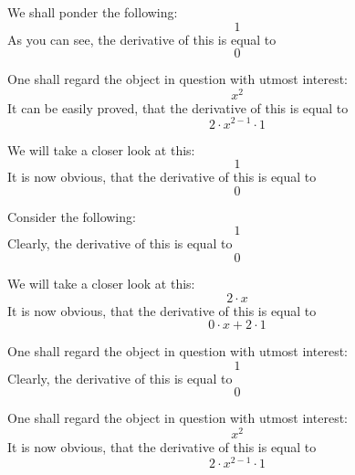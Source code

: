\documentclass{article}
\begin{document}
We shall ponder the following:
\begin{equation}
1 
\end{equation}
As you can see, the derivative of this is equal to
\begin{equation}
0 
\end{equation}

One shall regard the object in question with utmost interest:
\begin{equation}
x ^{2 } 
\end{equation}
It can be easily proved, that the derivative of this is equal to
\begin{equation}
2 \cdot x ^{2 - 1 } \cdot 1 
\end{equation}

We will take a closer look at this:
\begin{equation}
1 
\end{equation}
It is now obvious, that the derivative of this is equal to
\begin{equation}
0 
\end{equation}

Consider the following:
\begin{equation}
1 
\end{equation}
Clearly, the derivative of this is equal to
\begin{equation}
0 
\end{equation}

We will take a closer look at this:
\begin{equation}
2 \cdot x 
\end{equation}
It is now obvious, that the derivative of this is equal to
\begin{equation}
0 \cdot x + 2 \cdot 1 
\end{equation}

One shall regard the object in question with utmost interest:
\begin{equation}
1 
\end{equation}
Clearly, the derivative of this is equal to
\begin{equation}
0 
\end{equation}

One shall regard the object in question with utmost interest:
\begin{equation}
x ^{2 } 
\end{equation}
It is now obvious, that the derivative of this is equal to
\begin{equation}
2 \cdot x ^{2 - 1 } \cdot 1 
\end{equation}
\end{document}
